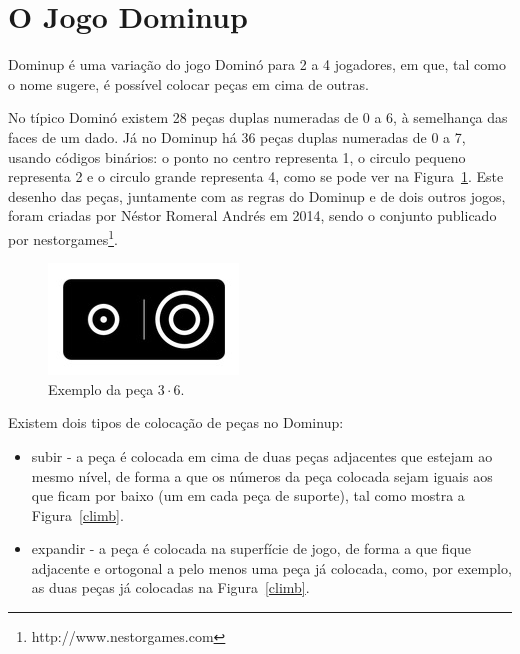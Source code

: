 \documentclass[a4paper]{article}
\begin{document}


\section{O Jogo Dominup}

Dominup é uma variação do jogo Dominó para 2 a 4 jogadores, em que, tal como o nome sugere, é possível colocar peças em cima de outras.

No típico Dominó existem 28 peças duplas numeradas de 0 a 6, à semelhança das faces de um dado. Já no Dominup há 36 peças duplas numeradas de 0 a 7, usando códigos binários: o ponto no centro representa 1, o circulo pequeno representa 2 e o circulo grande representa 4, como se pode ver na Figura~\ref{piece}. Este desenho das peças, juntamente com as regras do Dominup e de dois outros jogos, foram criadas por Néstor Romeral Andrés em 2014, sendo o conjunto publicado por nestorgames\footnote[1]{http://www.nestorgames.com}.

\begin{figure}[htbp]
\begin{center}
\includegraphics[scale=0.5]{piece.jpg}
\caption{Exemplo da peça $3 \cdot 6$.}
\label{piece}
\end{center}
\end{figure}

Existem dois tipos de colocação de peças no Dominup:
\begin{itemize}
	\item subir - a peça é colocada em cima de duas peças adjacentes que estejam ao mesmo nível, de forma a que os números da peça colocada sejam iguais aos que ficam por baixo (um em cada peça de suporte), tal como mostra a Figura~\ref{climb}.
	\item expandir - a peça é colocada na superfície de jogo, de forma a que fique adjacente e ortogonal a pelo menos uma peça já colocada, como, por exemplo, as duas peças já colocadas na Figura~\ref{climb}.
\end{itemize}
\end{document}
